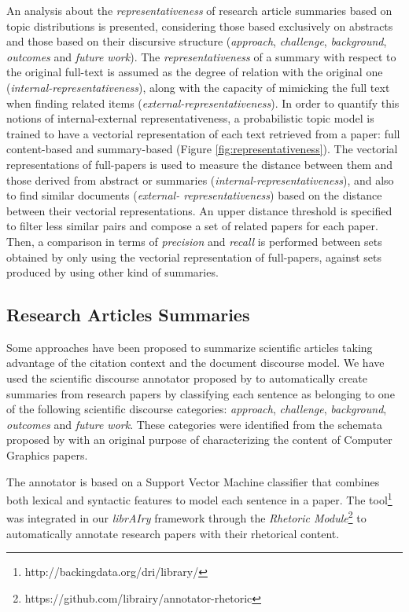 An analysis about the \textit{representativeness} of research article summaries based on topic distributions is presented, considering those based exclusively on abstracts and those based on their discursive structure (\textit{approach}, \textit{challenge}, \textit{background}, \textit{outcomes} and \textit{future work})\citep{SimoneTeufel2010}. The \textit{representativeness} of a summary with respect to the original full-text is assumed as the degree of relation with the original one (\textit{internal-representativeness}), along with the capacity of mimicking the full text when finding related items (\textit{external-representativeness}). In order to quantify this notions of internal-external representativeness, a probabilistic topic model is trained to have a vectorial representation of each text retrieved from a paper: full content-based and summary-based (Figure \ref{fig:representativeness}). The vectorial representations of full-papers is used to measure the distance between them and those derived from abstract or summaries (\textit{internal-representativeness}), and also to find similar documents (\textit{external- representativeness}) based on the distance between their vectorial representations. An upper distance threshold is specified to filter less similar pairs and compose a set of related papers for each paper. Then, a comparison in terms of \textit{precision} and \textit{recall} is performed between sets obtained by only using the vectorial representation of full-papers, against sets produced by using other kind of summaries.

\subsection{Research Articles Summaries}
\label{sec:annotator}
Some approaches have been proposed to summarize scientific articles \citep{Cohan2015} taking advantage of the citation context and the document discourse model. We have used the scientific discourse annotator proposed by \citep{Ronzano2015} to automatically create summaries from research papers by classifying each sentence as belonging to one of the following scientific discourse categories: \textit{approach}, \textit{challenge},  \textit{background}, \textit{outcomes} and \textit{future work}. These categories were identified from the schemata proposed by \citep{Teufel2009} with an original purpose of characterizing the content of Computer Graphics papers. 

The annotator is based on a Support Vector Machine classifier that combines both lexical and syntactic features to model each sentence in a paper. The tool\footnote{http://backingdata.org/dri/library/} was integrated in our \textit{librAIry} framework through the \textit{Rhetoric Module}\footnote{https://github.com/librairy/annotator-rhetoric} to automatically annotate research papers with their rhetorical content.

